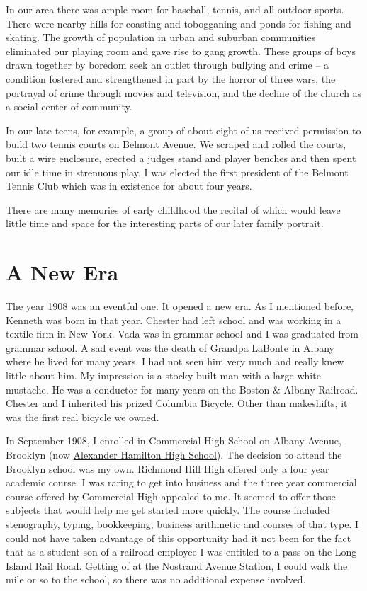 \documentclass[12pt]{book}              %
\begin{document}
In our area there was ample room for baseball, tennis, and all outdoor sports. There were nearby hills for coasting and tobogganing and ponds for fishing and skating. The growth of population in urban and suburban communities eliminated our playing room and gave rise to gang growth. These groups of boys drawn together by boredom seek an outlet through bullying and crime -- a condition fostered and strengthened in part by the horror of three wars, the portrayal of crime through movies and television, and the decline of the church as a social center of community. 

In our late teens, for example, a group of about eight of us received permission to build two tennis courts on Belmont Avenue. We scraped and rolled the courts, built a wire enclosure, erected a judges stand and player benches and then spent our idle time in strenuous play. I was elected the first president of the Belmont Tennis Club which was in existence for about four years. 

There are many memories of early childhood the recital of which would leave little time and space for the interesting parts of our later family portrait.

\chapter{A New Era}

The year 1908 was an eventful one. It opened a new era. As I mentioned before, Kenneth was born in that year. Chester had left school and was working in a textile firm in New York. Vada was in grammar school and I was graduated from grammar school. A sad event was the death of Grandpa LaBonte in Albany where he lived for many years. I had not seen him very much and really knew little about him. My impression is a stocky built man with a large white mustache. He was a conductor for many years on the Boston \& Albany Railroad. Chester and I inherited his prized Columbia Bicycle. Other than makeshifts, it was the first real bicycle we owned. 

In September 1908, I enrolled in Commercial High School on Albany Avenue, Brooklyn (now \href{http://www.brooklynvisualheritage.org/alexander-hamilton-high-school}{Alexander Hamilton High School}). The decision to attend the Brooklyn school was my own. Richmond Hill High offered only a four year academic course. I was raring to get into business and the three year commercial course offered by Commercial High appealed to me. It seemed to offer those subjects that would help me get started more quickly. The course included stenography, typing, bookkeeping, business arithmetic and courses of that type. I could not have taken advantage of this opportunity had it not been for the fact that as a student son of a railroad employee I was entitled to a pass on the Long Island Rail Road. Getting of at the Nostrand Avenue Station, I could walk the mile or so to the school, so there was no additional expense involved. 
\end{document}

